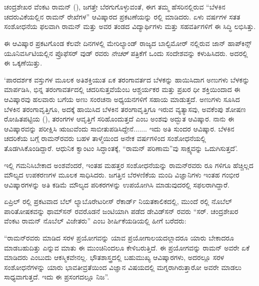 
\chapter{}


ಚಂದ್ರಶೇಖರ ವೆಂಕಟ ರಾಮನ್ (), ಜಗತ್ತೇ ಬೆರಗುಗೊಳ್ಳುವಂತೆ, ಈಗ ತಮ್ಮ ಹೆಸರಿನಲ್ಲಿರುವ “ಬೆಳಕಿನ ಚದರುವಿಕೆಯಲ್ಲಿನ ರಾಮನ್ ರೇಖೆಗಳ” ಆವಿಷ್ಕಾರದ ಪ್ರಕಟಣೆಯನ್ನು ರಲ್ಲಿ ಮಾಡಿದರು. ಏಳು ವರ್ಷಗಳ ಸತತ ಸಂಶೋಧನೆಯ ಫಲವಾಗಿ ರಾಮನ್ ಮತ್ತು ಅವರ ತಂಡದ ವಿದ್ಯಾರ್ಥಿಗಳು ಮತ್ತು ಸಹವರ್ತಿಗಳಿಗೆ ಈ ಸಿದ್ಧಿ ಲಭಿಸಿತ್ತು.

\vskip 1pt

ಈ ಆವಿಷ್ಕಾರ ಪ್ರಕಟಗೊಂಡ ಕೆಲವೇ ದಿನಗಳಲ್ಲಿ ಮೇರಿಲ್ಯಾಂಡ್ ರಾಜ್ಯದ ಬಾಲ್ಟಿಮೋರ್ ನಲ್ಲಿರುವ ಜಾನ್ ಹಾಪ್‍ಕಿನ್ಸ್ ಯೂನಿವರ್ಸಿಟಿಯಲ್ಲಿನ ಪ್ರೊಫೆಸರ್  ವುಡ್ ರವರು \textit{ನೇಚರ್} ಪತ್ರಿಕೆಗೆ ಒಂದು ಸಂದೇಶವನ್ನು ಕಳುಹಿಸಿದರು. ಅದರಲ್ಲಿ ಈ ಒಕ್ಕಣೆಯಿತ್ತು.

\vskip 1pt

‘ಪಾರದರ್ಶಕ ವಸ್ತುಗಳ ಮೂಲಕ ಅತಿಶಕ್ತಿಯುತ ಏಕ ತರಂಗಾವರ್ತದ ಬೆಳಕನ್ನು ಹಾಯಿಸಿದಾಗ ಅಣುಗಳು ಬೆಳಕನ್ನು ಮಾರ್ಪಡಿಸಿ, ಭಿನ್ನ ತರಂಗಾವರ್ತದಲ್ಲಿ ಚದರಿಸುತ್ತವೆಯೆಂಬ ಆಶ್ಚರ್ಯಕರ ಮತ್ತು ಪ್ರಖರ ಧೀ ಶಕ್ತಿಯಿಂದಾದ ಈ ಆವಿಷ್ಕಾರವು ಹಲವಾರು ಬಗೆಯ ಅಣು ಸಂರಚನಾ ಅಧ್ಯಯನಗಳಿಗೆ ಸಹಾಯ ಮಾಡುತ್ತದೆ. ಅಣುಗಳು ಸೂಸಿದ ಬೆಳಕಿನ ತರಂಗಾವೃತ್ತಿಗೂ, ಅದಕ್ಕೆ ಹಾಯಿಸಿದ ಬೆಳಕಿನ ತರಂಗಾವೃತ್ತಿಗೂ ಇರುವ ವ್ಯತ್ಯಾಸವು, ಅವಕೆಂಪು ಶೋಷಣ ರೋಹಿತಪಟ್ಟಿಯ (), ತರಂಗಗಳ ಆವೃತ್ತಿಗೆ ಸರಿಹೊಂದುತ್ತದೆ ಎಂಬ ಅಂಶವು ಅದ್ಭುತ ಆವಿಷ್ಕಾರ. ನಾನು ಈ ಆವಿಷ್ಕಾರವನ್ನು ಪರೀಕ್ಷಿಸಿ ಋಜುವೆಂದು ಸಾಬೀತುಪಡಿಸಿದ್ದೇನೆ....... ಇದು ಅತಿ ಸುಂದರ ಆವಿಷ್ಕಾರ. ಬೆಳಕಿನ ಚದರಿಕೆಯ ಬಗ್ಗೆ ರಾಮನ್‍ರವರು ಬಹಳ ತಾಳ್ಮೆಯಿಂದ ಅನೇಕ ವರ್ಷಗಳಿಂದ ಸಂಶೋಧನೆಯಲ್ಲಿ ತೊಡಗಿಸಿಕೊಂಡಿದ್ದಾರೆ. ಆಧುನಿಕ ಕ್ವಾಂಟಂ ಸಿದ್ಧಾಂತಕ್ಕೆ, “ರಾಮನ್ ಪರಿಣಾಮ”ವು ಸಾಕ್ಷ್ಯವನ್ನು ಒದುಗಿಸುತ್ತದೆ’.

\vskip 1pt

ಇಲ್ಲಿ ಗಮನಿಸಿಬೇಕಾದ ಅಂಶವೆಂದರೆ, ಇಂತಹ ಮಹತ್ತರ ಸಂಶೋಧನೆಯನ್ನು ರಾಮನ್‍ರವರು  ರೂ ಗಳಿಗೂ ಹೆಚ್ಚಿಲ್ಲದ ಮೌಲ್ಯದ ಉಪಕರಣಗಳ ಮೂಲಕ ಸಾಧಿಸಿದರು. ಜಗತ್ತಿನ ಬೆರಳಣಿಕೆಯ ಮಂದಿ ವಿಜ್ಞಾನಿಗಳು ಇಂತಹ ಗಂಭೀರ ಆವಿಷ್ಕಾರಗಳನ್ನು ಅತಿ ಕಡಿಮೆ ಮೌಲ್ಯದ ಪರಿಕರಗಳನ್ನು ಉಪಯೋಗಿಸಿ ಮಾಡುವುದರಲ್ಲಿ ಸಫಲರಾಗಿದ್ದಾರೆ.

\vskip 1pt

ಏಪ್ರಿಲ್ ರಲ್ಲಿ ಪ್ರಕಟವಾದ ಬೆಲ್ ಲ್ಯಾಬೊರೇಟರೀಸ್ ರೆಕಾರ್ಡ್ ನಿಯತಕಾಲಿಕದಲ್ಲಿ, ಮುಂದೆ ರಲ್ಲಿ ನೊಬೆಲ್ ಪಾರಿತೋಷಕವನ್ನು  ಥಾಮ್‍ಸನ್ ರವರೊಡನೆ ಜಂಟಿಯಾಗಿ ಪಡೆದ  ಡೇವಿಡ್‍ಸನ್ ರವರು “ಸರ್. ಚಂದ್ರಶೇಖರ ವೆಂಕಟ ರಾಮನ್ ನೊಬೆಲ್ ವಿಜೇತರು” ಎಂಬ ಶೀರ್ಷಿಕೆಯಡಿಯಲ್ಲಿ ಹೀಗೆ ಬರೆದರು:\enginline{-}

“ರಾಮನ್‍ರವರು ಮಾಡಿದ ಸರಳ ಪ್ರಯೋಗವನ್ನು ಯಾವ ಪ್ರಯೋಗಾಲಯದಲ್ಲಾದರೂ ಯಾರು ಬೇಕಾದರೂ ಮಾಡಬಹುದಿತ್ತು ಎನ್ನುವ ಮಾತು ಈ ಮುಂಚಿನಿಂದಲೂ ಕೇಳಿಬರುತ್ತಿದೆ. ಈ ಪ್ರಯೋಗವನ್ನು ರಾಮನ್ ಅವರೇ ಏಕೆ ಮಾಡಿದರು ಎಂಬುದು ಆಕಸ್ಮಿಕವೇನಲ್ಲ. ಭೌತಶಾಸ್ತ್ರದಲ್ಲಿ ಬಹುಮುಖ್ಯ ಆವಿಷ್ಕಾರಗಳು, ಅದರಲ್ಲೂ ಸರಳ ಸಂಶೋಧನೆಗಳನ್ನು ಯಾರು ಭಾವತೀವ್ರತೆಯಿಂದ ವಿಜ್ಞಾನ ವಿಷಯದಲ್ಲಿ ಮಗ್ನರಾಗಿರುತ್ತಾರೋ ಅವರೇ ಮಾಡಲು ಸಾಧ್ಯವಾಗುತ್ತದೆ. ಇದು ಈ ಪ್ರಸಂಗದಲ್ಲೂ ನಿಜ”.

